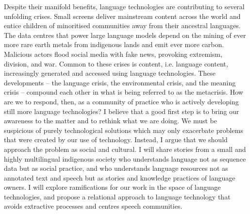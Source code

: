 Despite their manifold benefits, language technologies are contributing to several unfolding crises. Small screens deliver mainstream content across the world and entice children of minoritised communities away from their ancestral languages. The data centres that power large language models depend on the mining of ever more rare earth metals from indigenous lands and emit ever more carbon. Malicious actors flood social media with fake news, provoking extremism, division, and war. Common to these crises is content, i.e. language content, increasingly generated and accessed using language technologies. These developments – the language crisis, the environmental crisis, and the meaning crisis – compound each other in what is being referred to as the metacrisis. How are we to respond, then, as a community of practice who is actively developing still more language technologies? I believe that a good first step is to bring our awareness to the matter and to rethink what we are doing. We must be suspicious of purely technological solutions which may only exacerbate problems that were created by our use of technology. Instead, I argue that we should approach the problem as social and cultural. I will share stories from a small and highly multilingual indigenous society who understands language not as sequence data but as social practice, and who understands language resources not as annotated text and speech but as stories and knowledge practices of language owners. I will explore ramifications for our work in the space of language technologies, and propose a relational approach to language technology that avoids extractive processes and centres speech communities.